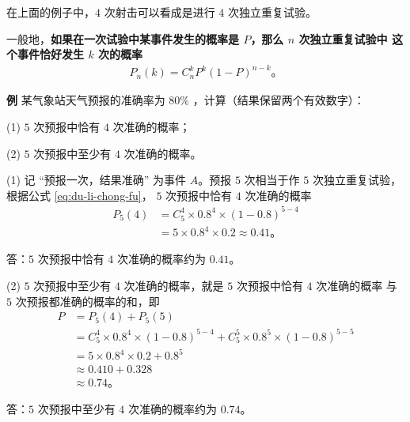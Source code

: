 在上面的例子中，$4$ 次射击可以看成是进行 $4$ 次独立重复试验。

一般地，\textbf{如果在一次试验中某事件发生的概率是 $P$，那么 $n$ 次独立重复试验中
这个事件恰好发生 $k$ 次的概率}
\begin{align}
    \boxed{P_n(k) = C_n^k P^k (1 - P)^{n-k} \text{。}} \tag{4} \label{eq:du-li-chong-fu}
\end{align}


\textbf{例} 某气象站天气预报的准确率为 $80\%$ ，计算（结果保留两个有效数字）：

(1) $5$ 次预报中恰有 $4$ 次准确的概率；

(2) $5$ 次预报中至少有 $4$ 次准确的概率。

\jie (1) 记 “预报一次，结果准确” 为事件 $A$。预报 $5$ 次相当于作 $5$ 次独立重复试验，
根据公式 \eqref{eq:du-li-chong-fu}， $5$ 次预报中恰有 $4$ 次准确的概率
\begin{align*}
    P_5(4) &= C_5^4 \times 0.8^4 \times (1 - 0.8)^{5-4} \\
            &= 5 \times 0.8^4 \times 0.2 \approx 0.41 \text{。}
\end{align*}

答：$5$ 次预报中恰有 $4$ 次准确的概率约为 $0.41$。

(2) $5$ 次预报中至少有 $4$ 次准确的概率，就是 $5$ 次预报中恰有 $4$ 次准确的概率
与 $5$ 次预报都准确的概率的和，即
\begin{align*}
    P &= P_5(4) + P_5(5) \\
        &= C_5^4 \times 0.8^4 \times (1 - 0.8)^{5-4} + C_5^5 \times 0.8^5 \times (1 - 0.8)^{5-5} \\
        &= 5 \times 0.8^4 \times 0.2 + 0.8^5 \\
        &\approx 0.410 + 0.328 \\
        &\approx 0.74 \text{。}
\end{align*}

答：$5$ 次预报中至少有 $4$ 次准确的概率约为 $0.74$。


\lianxi
\begin{xiaotis}



\end{xiaotis}


